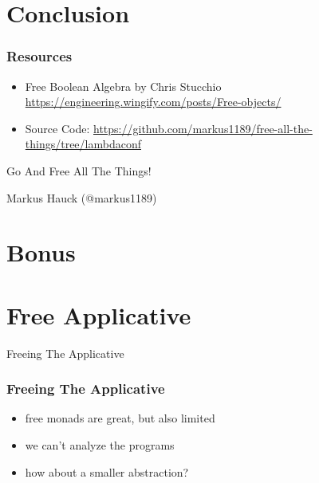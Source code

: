 \documentclass{beamer}
\begin{document}
\section{Conclusion}\label{sec:conclusion}

\begin{frame}
  \frametitle{Resources}
  \begin{itemize}
  \item Free Boolean Algebra by Chris Stucchio \url{https://engineering.wingify.com/posts/Free-objects/}
  \item Source Code: \url{https://github.com/markus1189/free-all-the-things/tree/lambdaconf}
  \end{itemize}
\end{frame}

\begin{frame}
  \begin{center}
    \Huge
    Go And Free All The Things!
  \end{center}
  \begin{center}
    Markus Hauck (@markus1189)
  \end{center}
\end{frame}

\begin{frame}
  \tableofcontents{}
\end{frame}

\appendix{}

\section*{Bonus}\label{sec:bonus}

\section{Free Applicative}\label{sec:free-applicative}
\begin{frame}
  \begin{center}
    \Huge
    Freeing The Applicative
  \end{center}
\end{frame}

\begin{frame}
  \frametitle{Freeing The Applicative}
  \begin{itemize}
  \item free monads are great, but also limited
  \item we can't analyze the programs
  \item how about a smaller abstraction?
  \end{itemize}
\end{frame}
\end{document}
